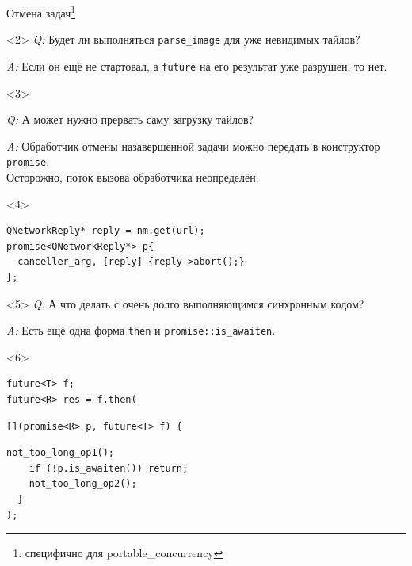 \documentclass[aspectratio=169,hyperref={unicode},17pt]{beamer}
\begin{document}
\begin{frame}[fragile,t]{Отмена задач\footnote{специфично для portable\_concurrency}}
\begin{onlyenv}<2>
{\em Q:} Будет ли выполняться \texttt{parse\_image} для уже невидимых тайлов?

{\em A:} Если он ещё не стартовал, а \texttt{future} на его результат уже разрушен, то нет.
\end{onlyenv}
\begin{onlyenv}<3>

{\em Q:} А может нужно прервать саму загрузку тайлов?

{\em A:} Обработчик отмены назавершённой задачи можно передать в конструктор \texttt{promise}.\\
\footnotesize{Осторожно, поток вызова обработчика неопределён.}
\end{onlyenv}
\begin{onlyenv}<4>
\begin{lstlisting}[style=cppcode]
QNetworkReply* reply = nm.get(url);
promise<QNetworkReply*> p{
  canceller_arg, [reply] {reply->abort();}
};
\end{lstlisting}
\end{onlyenv}
\begin{onlyenv}<5>
{\em Q:} А что делать с очень долго выполняющимся синхронным кодом?

{\em A:} Есть ещё одна форма \texttt{then} и \texttt{promise::is\_awaiten}.
\end{onlyenv}
\begin{onlyenv}<6>
\begin{lstlisting}[style=cppcode,aboveskip=0pt,belowskip=0pt]
future<T> f;
future<R> res = f.then(
\end{lstlisting}
\begin{lstlisting}[style=cppcode,backgroundcolor=\color{gray!30},aboveskip=0pt,belowskip=0pt]
  [](promise<R> p, future<T> f) {
\end{lstlisting}
\begin{lstlisting}[style=cppcode,aboveskip=0pt,belowskip=0pt]
    not_too_long_op1();
    if (!p.is_awaiten()) return;
    not_too_long_op2();
  }
);
\end{lstlisting}
\end{onlyenv}
\end{frame}
\end{document}
